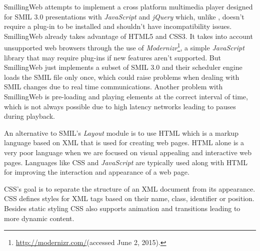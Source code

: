   SmillingWeb \cite{smillingweb} attempts to implement a cross platform multimedia player designed for \ac{SMIL} 3.0 presentations with \emph{JavaScript} and \emph{jQuery} which, unlike \cite{ambulant}, doesn't require a plug-in to be installed and shouldn't have incompatibility issues. 
  SmillingWeb already takes advantage of \ac{HTML}5 and \ac{CSS}3.
  It takes into account unsupported web browsers through the use of \emph{Modernizr}\footnote{\url{http://modernizr.com/}(accessed June 2, 2015).}, a simple \emph{JavaScript} library that may require plug-ins if new features aren't supported.  
  But SmillingWeb just implements a subset of \ac{SMIL} 3.0 and their scheduler engine loads the \ac{SMIL} file only once, which could raise problems when dealing with \ac{SMIL} changes due to real time communications.
  Another problem with SmillingWeb is pre-loading and playing elements at the correct interval of time, which is not always possible due to high latency networks leading to  pauses during playback.



  An alternative to \ac{SMIL}'s \emph{Layout} module is to use \ac{HTML} which is a markup language based on \ac{XML} that is used for creating web pages. \ac{HTML} alone is a very poor language when we are focused on visual appealing and interactive web pages. Languages like \ac{CSS} and \emph{JavaScript} are typically used along with \ac{HTML} for improving the interaction and appearance of a web page. 


  
  \ac{CSS}'s goal is to separate the structure of an \ac{XML} document from its appearance. \ac{CSS} defines styles for \ac{XML} tags based on their name, class, identifier or position.
  Besides static styling \ac{CSS} also supports animation and transitions leading to more dynamic content.

